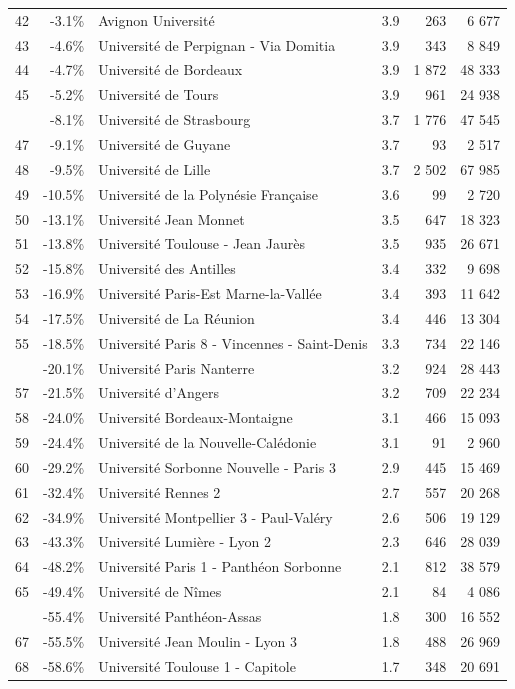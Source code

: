 \documentclass[12pt,french,]{article}
\begin{document}
\begin{longtable}{rrlrrr}
42 & -3.1\% & Avignon Université & 3.9 & 263 & 6 677\\
\rowcolor{gray!6}  43 & -4.6\% & Université de Perpignan - Via Domitia & 3.9 & 343 & 8 849\\
44 & -4.7\% & Université de Bordeaux & 3.9 & 1 872 & 48 333\\
\rowcolor{gray!6}  45 & -5.2\% & Université de Tours & 3.9 & 961 & 24 938\\
\addlinespace
46 & -8.1\% & Université de Strasbourg & 3.7 & 1 776 & 47 545\\
\rowcolor{gray!6}  47 & -9.1\% & Université de Guyane & 3.7 & 93 & 2 517\\
48 & -9.5\% & Université de Lille & 3.7 & 2 502 & 67 985\\
\rowcolor{gray!6}  49 & -10.5\% & Université de la Polynésie Française & 3.6 & 99 & 2 720\\
50 & -13.1\% & Université Jean Monnet & 3.5 & 647 & 18 323\\
\addlinespace
\rowcolor{gray!6}  51 & -13.8\% & Université Toulouse - Jean Jaurès & 3.5 & 935 & 26 671\\
52 & -15.8\% & Université des Antilles & 3.4 & 332 & 9 698\\
\rowcolor{gray!6}  53 & -16.9\% & Université Paris-Est Marne-la-Vallée & 3.4 & 393 & 11 642\\
54 & -17.5\% & Université de La Réunion & 3.4 & 446 & 13 304\\
\rowcolor{gray!6}  55 & -18.5\% & Université Paris 8 - Vincennes - Saint-Denis & 3.3 & 734 & 22 146\\
\addlinespace
56 & -20.1\% & Université Paris Nanterre & 3.2 & 924 & 28 443\\
\rowcolor{gray!6}  57 & -21.5\% & Université d'Angers & 3.2 & 709 & 22 234\\
58 & -24.0\% & Université Bordeaux-Montaigne & 3.1 & 466 & 15 093\\
\rowcolor{gray!6}  59 & -24.4\% & Université de la Nouvelle-Calédonie & 3.1 & 91 & 2 960\\
60 & -29.2\% & Université Sorbonne Nouvelle - Paris 3 & 2.9 & 445 & 15 469\\
\addlinespace
\rowcolor{gray!6}  61 & -32.4\% & Université Rennes 2 & 2.7 & 557 & 20 268\\
62 & -34.9\% & Université Montpellier 3 - Paul-Valéry & 2.6 & 506 & 19 129\\
\rowcolor{gray!6}  63 & -43.3\% & Université Lumière - Lyon 2 & 2.3 & 646 & 28 039\\
64 & -48.2\% & Université Paris 1 - Panthéon Sorbonne & 2.1 & 812 & 38 579\\
\rowcolor{gray!6}  65 & -49.4\% & Université de Nîmes & 2.1 & 84 & 4 086\\
\addlinespace
66 & -55.4\% & Université Panthéon-Assas & 1.8 & 300 & 16 552\\
\rowcolor{gray!6}  67 & -55.5\% & Université Jean Moulin - Lyon 3 & 1.8 & 488 & 26 969\\
68 & -58.6\% & Université Toulouse 1 - Capitole & 1.7 & 348 & 20 691\\*
\end{longtable}
\end{document}
